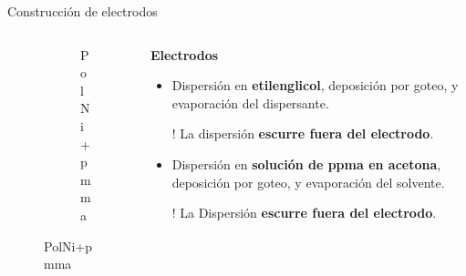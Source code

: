 \documentclass[aspectratio=169]{beamer}
\begin{document}
\begin{frame}{Construcción de electrodos}
\begin{columns}
\begin{column}{0.3\textwidth}
\begin{figure}
{\begin{subfigure}[b]{\electrodesWidth}
						\caption{PolNi+pmma}
					\end{subfigure}}
				\end{figure}
			\end{column}
			\begin{column}{0.6\textwidth}
				\textbf{Electrodos}
				\begin{itemize}[<+(1)->]
					\item Dispersión en \textbf{etilenglicol}, deposición por goteo, y evaporación del dispersante.
					\item[!] La dispersión \textbf{escurre fuera del electrodo}.
					\item Dispersión en \textbf{solución de ppma en acetona}, deposición por goteo, y evaporación del solvente.
					\item[!] La Dispersión \textbf{escurre fuera del electrodo}.
				\end{itemize}
			\end{column}
		\end{columns}		
	\end{frame}
	
\end{document}
